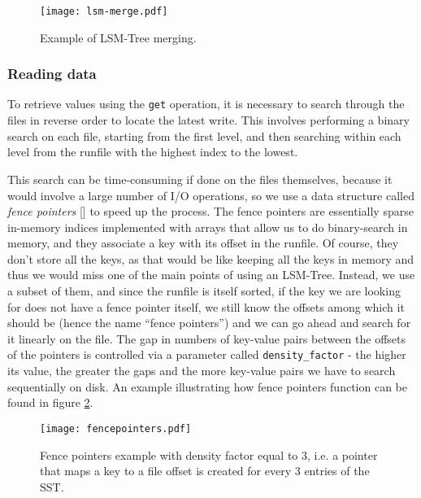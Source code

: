 \vspace{20px}
\begin{figure}[h]
    \centering
    \texttt{[image: lsm-merge.pdf]}
    \caption{Example of LSM-Tree merging.}
    \label{fig:lsm-merge}
\end{figure}
\vspace{20px}

\subsubsection{Reading data}

To retrieve values using the \verb"get" operation, it is necessary to search through the files in reverse order to locate the latest write.
This involves performing a binary search on each file, starting from the first level, and then searching within each level from the runfile with the highest index to the lowest.

This search can be time-consuming if done on the files themselves, because it would involve a large number of I/O operations, so we use a data structure called \textit{fence pointers} [\cite{fence-pointers}] to speed up the process. The fence pointers are essentially sparse in-memory indices implemented with arrays that allow us to do binary-search in memory, and they associate a key with its offset in the runfile. Of course, they don't store all the keys, as that would be like keeping all the keys in memory and thus we would miss one of the main points of using an LSM-Tree. Instead, we use a subset of them, and since the runfile is itself sorted, if the key we are looking for does not have a fence pointer itself, we still know the offsets among which it should be (hence the name ``fence pointers'') and we can go ahead and search for it linearly on the file. The gap in numbers of key-value pairs between the offsets of the pointers is controlled via a parameter called \verb"density_factor" - the higher its value, the greater the gaps and the more key-value pairs we have to search sequentially on disk. An example illustrating how fence pointers function can be found in figure \ref{fig:fence-pointers}.

\vspace{20px}
\begin{figure}[h]
    \centering
    \texttt{[image: fencepointers.pdf]}
    \caption{Fence pointers example with density factor equal to 3, i.e. a pointer that maps a key to a file offset is created for every 3 entries of the SST.}
    \label{fig:fence-pointers}
\end{figure}
\vspace{20px}

